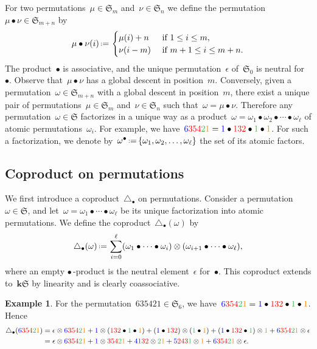 \documentclass{amsart}
\theoremstyle{definition}
\newtheorem{example}[theorem]{Example}
\newcommand{\bk}{\mathbf{k}} %
\newcommand{\eqdef}{\mbox{\,\raisebox{0.2ex}{\scriptsize\ensuremath{\mathrm:}}\ensuremath{=}\,}} %
\renewcommand{\b}[1]{{\color{blue} #1}} %
\renewcommand{\r}[1]{{\color{red} #1}} %
\newcommand{\g}[1]{{\color{DarkGreen} #1}} %
\renewcommand{\o}[1]{{\color{orange} #1}} %
\newcommand{\fS}{\mathfrak{S}} %
\newcommand{\gdproduct}{\bullet} %
\newcommand{\gddeconcat}{\coproduct_\gdproduct} %
\newcommand{\HS}{{\bk\fS}} %
\newcommand{\coproduct}{\triangle} %
\begin{document}
For two permutations~$\mu \in \fS_m$ and~$\nu \in \fS_n$ we define the permutation~$\mu \gdproduct \nu \in \fS_{m+n}$ by 
\[
\mu \gdproduct \nu(i) \eqdef
\begin{cases}
	\mu(i)+n & \text{ if } 1   \le i \le m,  \\
	\nu(i-m) & \text{ if } m+1 \le i \le m+n.
\end{cases}
\]
The product~$\gdproduct$ is associative, and the unique permutation~$\epsilon$ of~$\fS_0$ is neutral for~$\gdproduct$. Observe that~$\mu \gdproduct \nu$ has a global descent in position~$m$. Conversely, given a permutation~$\omega \in \fS_{m+n}$ with a global descent in position~$m$, there exist a unique pair of permutations~${\mu \in \fS_m}$ and~${\nu \in \fS_{n}}$ such that~${\omega = \mu \gdproduct \nu}$. Therefore any permutation~$\omega \in \fS$ factorizes in a unique way as a product~${\omega = \omega_1 \gdproduct \omega_2 \gdproduct \cdots \gdproduct \omega_\ell}$ of atomic permutations~$\omega_i$. For example, we have~$\b{6}\r{354}\g{2}\o{1} = \b{1} \gdproduct \r{132} \gdproduct \g{1} \gdproduct \o{1}$. For such a factorization, we denote by~$\omega^{\gdproduct} \eqdef \{\omega_1, \omega_2, \dots, \omega_\ell\}$ the set of its atomic factors.


\subsection{Coproduct on permutations}
\label{subsec:coproductPermutations}

We first introduce a coproduct~$\gddeconcat$ on permutations. Consider a permutation~$\omega \in \fS$, and let~${\omega = \omega_1 \gdproduct \cdots \gdproduct \omega_\ell}$ be its unique factorization into atomic permutations. We define the coproduct~$\gddeconcat(\omega)$ by
\[
\gddeconcat(\omega) \eqdef \sum_{i=0}^\ell (\omega_1 \gdproduct \cdots \gdproduct \omega_i) \otimes (\omega_{i+1} \gdproduct \cdots \gdproduct \omega_\ell),
\]
where an empty $\gdproduct\,$-product is the neutral element~$\epsilon$ for~$\gdproduct$. This coproduct extends to~$\HS$ by linearity and is clearly coassociative.

\begin{example} 
For the permutation~$635421 \in \fS_6$, we have~$\b{6}\r{354}\g{2}\o{1} = \b{1} \gdproduct \r{132} \gdproduct \g{1} \gdproduct \o{1}$. Hence
\begin{align*}
\gddeconcat(\b{6}\r{354}\g{2}\o{1}) & = \epsilon \otimes \b{6}\r{354}\g{2}\o{1} + \b{1} \otimes (\r{132} \gdproduct \g{1} \gdproduct \o{1}) + (\b{1} \gdproduct \r{132}) \otimes (\g{1} \gdproduct \o{1}) + (\b{1} \gdproduct \r{132} \gdproduct \g{1}) \otimes \o{1} + \b{6}\r{354}\g{2}\o{1} \otimes \epsilon \\
& = \epsilon \otimes \b{6}\r{354}\g{2}\o{1} + \b{1} \otimes \r{354}\g{2}\o{1} + \b{4}\r{132} \otimes \g{2}\o{1} + \b{5}\r{243}\g{1} \otimes \o{1} + \b{6}\r{354}\g{2}\o{1} \otimes \epsilon.
\end{align*}
\end{example}
\end{document}
